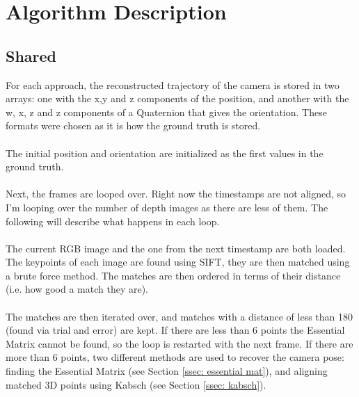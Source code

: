 \documentclass[12pt,a4paper]{article}
\begin{document}
\newpage
\section{Algorithm Description}
\label{sec: algo}

\subsection{Shared}
For each approach, the reconstructed trajectory of the camera is stored in two arrays: one with the x,y and z components of the position, and another with the w, x, z and z components of a Quaternion that gives the orientation. These formats were chosen as it is how the ground truth is stored.
\\\\
The initial position and orientation are initialized as the first values in the ground truth.
\\\\
Next, the frames are looped over. Right now the timestamps are not aligned, so I'm looping over the number of depth images as there are less of them. The following will describe what happens in each loop.
\\\\
The current RGB image and the one from the next timestamp are both loaded. The keypoints of each image are found using SIFT, they are then matched using a brute force method. The matches are then ordered in terms of their distance (i.e. how good a match they are). 
\\\\
The matches are then iterated over, and matches with a distance of less than 180 (found via trial and error) are kept. If there are less than 6 points the Essential Matrix cannot be found, so the loop is restarted with the next frame. If there are more than 6 points, two different methods are used to recover the camera pose: finding the Essential Matrix (see Section \ref{ssec: essential mat}), and aligning matched 3D points using Kabsch (see Section \ref{ssec: kabsch}).
\end{document}
